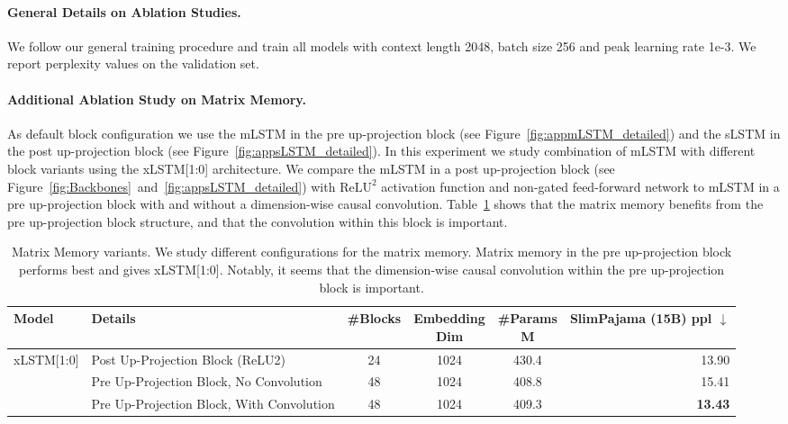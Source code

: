 \documentclass[dvipsnames]{article}
\newcommand{\first}[1]{\textbf{#1}}
\begin{document}
\begin{appendix}
\paragraph{General Details on Ablation Studies.}
\label{sec:appAblDetails}
We follow our general training procedure and train all models with context length 2048, batch size 256 and peak learning rate 1e-3.
We report perplexity values on the validation set.
\pagebreak
 \paragraph{Additional Ablation Study on Matrix Memory.} As default block configuration we use the mLSTM in the pre up-projection block (see Figure~\ref{fig:appmLSTM_detailed}) and the sLSTM in the post up-projection block (see Figure~\ref{fig:appsLSTM_detailed}).
In this experiment we study combination of mLSTM with different block variants using the xLSTM[1:0] architecture.
We compare the mLSTM in a post up-projection block (see Figure~\ref{fig:Backbones}~and~\ref{fig:appsLSTM_detailed}) with $\text{ReLU}^2$ activation function and non-gated feed-forward network to mLSTM in a pre up-projection block with and without a dimension-wise causal convolution.
Table~\ref{tab:abl_matrixmemory} shows that the matrix memory benefits from the pre up-projection block structure, and that the convolution within this block is important.
\begin{table}[htbp]
    \centering
    \begin{adjustbox}{width=\textwidth}
    \begin{tabular}{llcccr}
    \toprule
    Model                       & Details                                         & \#Blocks & \thead{Embedding                 \\ Dim}& \thead{\#Params         \\ M} & \thead{SlimPajama \\ (15B) ppl $\downarrow$}  \\
    \midrule
    \multirow{3}{*}{xLSTM[1:0]} & Post Up-Projection Block (ReLU2) & 24       & 1024             & 430.4 & 13.90 \\
                                & Pre Up-Projection Block, No Convolution         & 48       & 1024             & 408.8 & 15.41 \\
                                & Pre Up-Projection Block, With Convolution       & 48       & 1024             & 409.3 & \first{13.43} \\
    \bottomrule
\end{tabular}
    \end{adjustbox}
    \vspace{0.1cm}
    \caption{Matrix Memory variants. We study different configurations for the matrix memory. Matrix memory in the pre up-projection block performs best and gives xLSTM[1:0]. Notably, it seems that the dimension-wise causal convolution within the pre up-projection block is important.}
    \label{tab:abl_matrixmemory}
\end{table}

\end{appendix}
\end{document}
